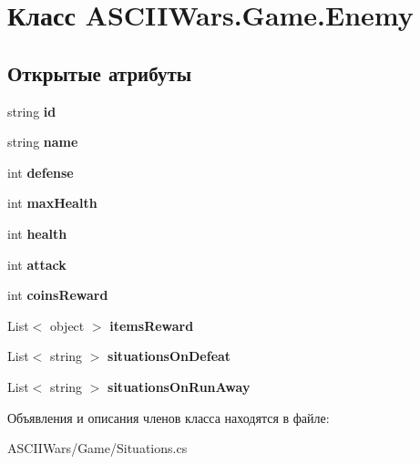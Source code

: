 \hypertarget{class_a_s_c_i_i_wars_1_1_game_1_1_enemy}{}\section{Класс A\+S\+C\+I\+I\+Wars.\+Game.\+Enemy}
\label{class_a_s_c_i_i_wars_1_1_game_1_1_enemy}
\subsection*{Открытые атрибуты}
\begin{DoxyCompactItemize}
\item 
\hypertarget{class_a_s_c_i_i_wars_1_1_game_1_1_enemy_a4899e9443d2f01a8f95b187784ba08c9}{}\label{class_a_s_c_i_i_wars_1_1_game_1_1_enemy_a4899e9443d2f01a8f95b187784ba08c9} 
string {\bfseries id}
\item 
\hypertarget{class_a_s_c_i_i_wars_1_1_game_1_1_enemy_a50cedf172e072311d4fafa5bbe5991e5}{}\label{class_a_s_c_i_i_wars_1_1_game_1_1_enemy_a50cedf172e072311d4fafa5bbe5991e5} 
string {\bfseries name}
\item 
\hypertarget{class_a_s_c_i_i_wars_1_1_game_1_1_enemy_a5a07bdd5189ac07e2c46fab4c2ee2d32}{}\label{class_a_s_c_i_i_wars_1_1_game_1_1_enemy_a5a07bdd5189ac07e2c46fab4c2ee2d32} 
int {\bfseries defense}
\item 
\hypertarget{class_a_s_c_i_i_wars_1_1_game_1_1_enemy_a491cc3f4cf2ffe2a412411248cd9736a}{}\label{class_a_s_c_i_i_wars_1_1_game_1_1_enemy_a491cc3f4cf2ffe2a412411248cd9736a} 
int {\bfseries max\+Health}
\item 
\hypertarget{class_a_s_c_i_i_wars_1_1_game_1_1_enemy_a9240cccb69253549bf7d72620a3c9171}{}\label{class_a_s_c_i_i_wars_1_1_game_1_1_enemy_a9240cccb69253549bf7d72620a3c9171} 
int {\bfseries health}
\item 
\hypertarget{class_a_s_c_i_i_wars_1_1_game_1_1_enemy_aa1bec7d23246d8a7ebbe547e5b0b914f}{}\label{class_a_s_c_i_i_wars_1_1_game_1_1_enemy_aa1bec7d23246d8a7ebbe547e5b0b914f} 
int {\bfseries attack}
\item 
\hypertarget{class_a_s_c_i_i_wars_1_1_game_1_1_enemy_abc760eceff65559b850946aed3c9ee73}{}\label{class_a_s_c_i_i_wars_1_1_game_1_1_enemy_abc760eceff65559b850946aed3c9ee73} 
int {\bfseries coins\+Reward}
\item 
\hypertarget{class_a_s_c_i_i_wars_1_1_game_1_1_enemy_a8384648b50497682099da7a041f4ca72}{}\label{class_a_s_c_i_i_wars_1_1_game_1_1_enemy_a8384648b50497682099da7a041f4ca72} 
List$<$ object $>$ {\bfseries items\+Reward}
\item 
\hypertarget{class_a_s_c_i_i_wars_1_1_game_1_1_enemy_a6250d32cd64b9c25fccad4ff503856f2}{}\label{class_a_s_c_i_i_wars_1_1_game_1_1_enemy_a6250d32cd64b9c25fccad4ff503856f2} 
List$<$ string $>$ {\bfseries situations\+On\+Defeat}
\item 
\hypertarget{class_a_s_c_i_i_wars_1_1_game_1_1_enemy_aaf3d6f61b5b3bc7aad9188a0eb9795aa}{}\label{class_a_s_c_i_i_wars_1_1_game_1_1_enemy_aaf3d6f61b5b3bc7aad9188a0eb9795aa} 
List$<$ string $>$ {\bfseries situations\+On\+Run\+Away}
\end{DoxyCompactItemize}


Объявления и описания членов класса находятся в файле\+:\begin{DoxyCompactItemize}
\item 
A\+S\+C\+I\+I\+Wars/\+Game/Situations.\+cs\end{DoxyCompactItemize}
